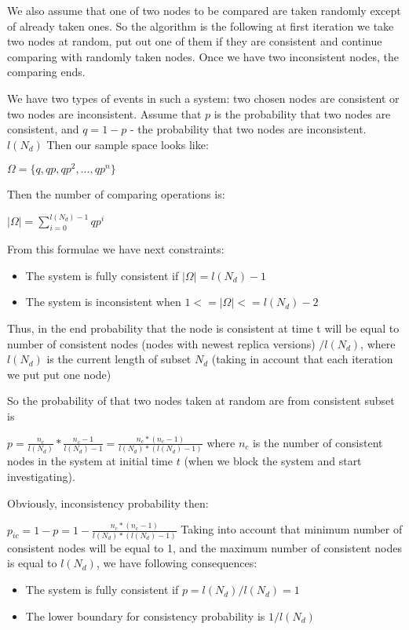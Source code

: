 \documentclass{llncs}
\begin{document}
We also assume that one of two nodes to be compared are taken randomly except of already taken ones. So the algorithm is the following at first iteration we take two nodes at random, put out one of them if they are consistent and continue comparing with randomly taken nodes. Once we have two inconsistent nodes, the comparing ends.

We have two types of events in such a system: two chosen nodes are consistent or two nodes are inconsistent.
Assume that $p$ is the probability that two nodes are consistent, and
$q = 1 -p$ - the probability that two nodes are inconsistent.
$l(N_d)$
Then our sample space looks like:

$\Omega = \{q, qp, qp^2, ..., qp^n\}$

Then the number of comparing operations is:

$\vert\Omega\vert = \sum_{i=0}^{l(N_d)-1}qp^i$

From this formulae we have next constraints:
\begin{itemize}
\item The system is fully consistent if $\vert\Omega\vert = l(N_d)-1$
\item The system is inconsistent when $1 <= \vert\Omega\vert <= l(N_d) -2$
\end{itemize}

Thus, in the end probability that the node is consistent at time t will be equal to number of consistent nodes (nodes with newest replica versions) $/ l(N_d)$, where $l(N_d)$ is the current length of subset $N_d$ (taking in account that each iteration we put put one node)

So the probability of that two nodes taken at random are from consistent subset is 

$p = \frac{n_c}{l(N_d)} * \frac{n_c - 1}{l(N_d) - 1} = \frac{n_c * (n_c - 1)}{l(N_d)* (l(N_d) -1)}$ where $n_c$ is the number of consistent nodes in the system at initial time $t$ (when we block the system and start investigating).

Obviously, inconsistency probability then:

$p_{ic} = 1 - p = 1 - \frac{n_c * (n_c - 1)}{l(N_d)* (l(N_d) -1)}$
Taking into account that minimum number of consistent nodes will be equal to 1, and the maximum number of consistent nodes is equal to $l(N_d)$, we have following consequences:
\begin{itemize}
\item The system is fully consistent if $p = l(N_d) / l(N_d) = 1$
\item The lower boundary for consistency probability is $1 / l(N_d)$
\end{itemize}
\end{document}

